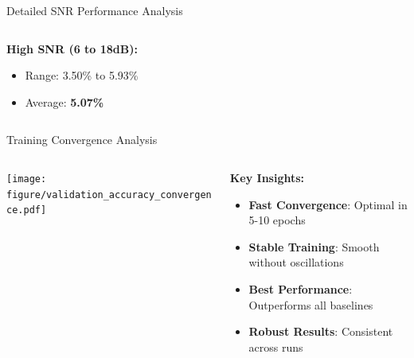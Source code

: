 \documentclass[aspectratio=169]{beamer}
\begin{document}
\begin{frame}{Detailed SNR Performance Analysis}
\begin{columns}
\begin{column}{0.5\textwidth}
\textbf{\textcolor{zjutgreen}{High SNR (6 to 18dB):}}
\begin{itemize}
\footnotesize
\setlength{\itemsep}{0pt}
\item Range: 3.50\% to 5.93\%
\item Average: \textbf{5.07\%}
\end{itemize}

\vspace{0.2cm}

\end{column}
\end{columns}
\end{frame}

\begin{frame}{Training Convergence Analysis}
\begin{columns}
\begin{column}{0.55\textwidth}
\texttt{[image: figure/validation\_accuracy\_convergence.pdf]}
\end{column}
\begin{column}{0.45\textwidth}
\textbf{Key Insights:}
\begin{itemize}
\item \textcolor{zjutgreen}{\textbf{Fast Convergence}}: Optimal in 5-10 epochs
\item \textcolor{zjutgreen}{\textbf{Stable Training}}: Smooth without oscillations
\item \textcolor{zjutgreen}{\textbf{Best Performance}}: Outperforms all baselines
\item \textcolor{zjutgreen}{\textbf{Robust Results}}: Consistent across runs
\end{itemize}

\vspace{0.3cm}
\begin{center}
\end{center}
\end{column}
\end{columns}
\end{frame}
\end{document}
